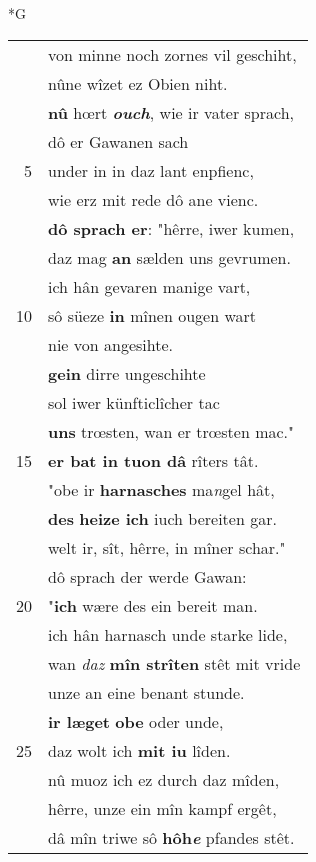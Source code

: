 \documentclass[8pt,a4paper,notitlepage]{article}
\begin{document}
\newpage
\begin{table}[ht]
\begin{minipage}[t]{0.5\linewidth}
\small
\begin{center}*G
\end{center}
\begin{tabular}{rl}
 & von minne noch zornes vil geschiht,\\ 
 & nûne wîzet ez Obien niht.\\ 
 & \textbf{nû} hœrt \textit{\textbf{ouch}}, wie ir vater sprach,\\ 
 & dô er Gawanen sach\\ 
5 & under in in daz lant enpfienc,\\ 
 & wie erz mit rede dô ane vienc.\\ 
 & \textbf{dô sprach er}: "hêrre, iwer kumen,\\ 
 & daz mag \textbf{an} sælden uns gevrumen.\\ 
 & ich hân gevaren manige vart,\\ 
10 & sô süeze \textbf{in} mînen ougen wart\\ 
 & nie von angesihte.\\ 
 & \textbf{gein} dirre ungeschihte\\ 
 & sol iwer künfticlîcher tac\\ 
 & \textbf{uns} trœsten, wan er trœsten mac."\\ 
15 & \textbf{er bat in tuon dâ} rîters tât.\\ 
 & "obe ir \textbf{harnasches} ma\textit{n}gel hât,\\ 
 & \textbf{des} \textbf{heize ich} iuch bereiten gar.\\ 
 & welt ir, sît, hêrre, in mîner schar."\\ 
 & dô sprach der werde Gawan:\\ 
20 & "\textbf{ich} wære des ein bereit man.\\ 
 & ich hân harnasch unde starke lide,\\ 
 & wan \textit{daz} \textbf{mîn strîten} stêt mit vride\\ 
 & unze an eine benant stunde.\\ 
 & \textbf{ir læget} \textbf{obe} oder unde,\\ 
25 & daz wolt ich \textbf{mit iu} lîden.\\ 
 & nû muoz ich ez durch daz mîden,\\ 
 & hêrre, unze ein mîn kampf ergêt,\\ 
 & dâ mîn triwe sô \textbf{hôh\textit{e}} pfandes stêt.\\ 

\end{tabular}
\end{minipage}
\end{table}
\end{document}
